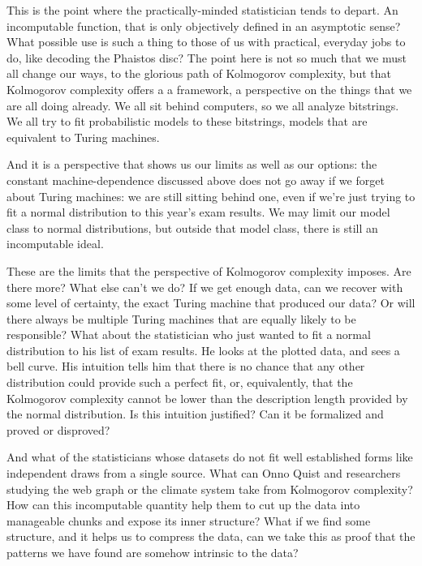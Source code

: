 This is the point where the practically-minded statistician tends to depart. An incomputable function, that is only objectively defined in an asymptotic sense? What possible use is such a thing to those of us with practical, everyday jobs to do, like decoding the Phaistos disc? The point here is not so much that we must all change our ways, to the glorious path of Kolmogorov complexity, but that Kolmogorov complexity offers a a framework, a perspective on the things that we are all doing already. We all sit behind computers, so we all analyze bitstrings. We all try to fit probabilistic models to these bitstrings, models that are equivalent to Turing machines.

And it is a perspective that shows us our limits as well as our options: the constant machine-dependence discussed above does not go away if we forget about Turing machines: we are still sitting behind one, even if we're just trying to fit a normal distribution to this year's exam results. We may limit our model class to normal distributions, but outside that model class, there is still an incomputable ideal.

These are the limits that the perspective of Kolmogorov complexity imposes. Are there more? What else can't we do? If we get enough data, can we recover with some level of certainty, the exact Turing machine that produced our data? Or will there always be multiple Turing machines that are equally likely to be responsible? What about the statistician who just wanted to fit a normal distribution to his list of exam results. He looks at the plotted data, and sees a bell curve. His intuition tells him that there is no chance that any other distribution could provide such a perfect fit, or, equivalently, that the Kolmogorov complexity cannot be lower than the description length provided by the normal distribution. Is this intuition justified? Can it be formalized and proved or disproved?

And what of the statisticians whose datasets do not fit well established forms like independent draws from a single source. What can Onno Quist and researchers studying the web graph or the climate system take from Kolmogorov complexity? How can this incomputable quantity help them to cut up the data into manageable chunks and expose its inner structure? What if we find some structure, and it helps us to compress the data, can we take this as proof that the patterns we have found are somehow intrinsic to the data?

